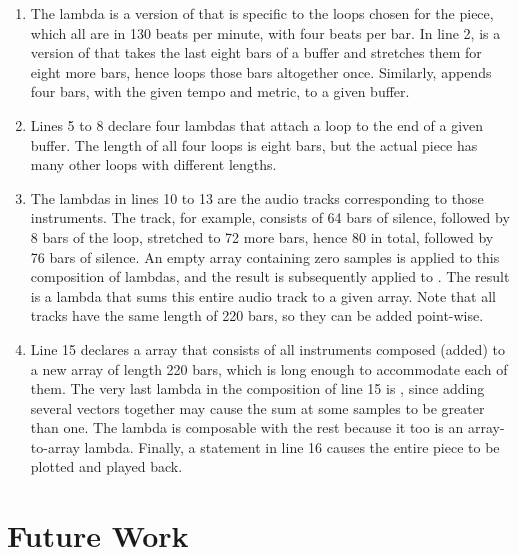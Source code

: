 \begin{enumerate}
	\item The  lambda is a version of  that is specific to the loops chosen for the piece, which all are in 130 beats per minute, with four beats per bar. In line 2,  is a version of  that takes the last eight bars of a buffer and stretches them for eight more bars, hence loops those bars altogether once. Similarly,  appends four bars, with the given tempo and metric, to a given buffer.
	\addtocounter{enumi}{3}
	\item Lines 5 to 8 declare four lambdas that attach a loop to the end of a given buffer. The length of all four loops is eight bars, but the actual piece has many other loops with different lengths.
	\addtocounter{enumi}{4}
	\item The lambdas in lines 10 to 13 are the audio tracks corresponding to those instruments. The  track, for example, consists of 64 bars of silence, followed by 8 bars of the  loop, stretched to 72 more bars, hence 80 in total, followed by 76 bars of silence. An empty array containing zero samples is applied to this composition of lambdas, and the result is subsequently applied to . The result is a lambda that sums this entire audio track to a given array. Note that all tracks have the same length of 220 bars, so they can be added point-wise.
	\addtocounter{enumi}{4}
	\item Line 15 declares a  array that consists of all instruments composed (added) to a new array of length 220 bars, which is long enough to accommodate each of them. The very last lambda in the composition of line 15 is , since adding several vectors together may cause the sum at some samples to be greater than one. The  lambda is composable with the rest because it too is an array-to-array lambda. Finally, a  statement in line 16 causes the entire piece to be plotted and played back.
\end{enumerate}

\section{Future Work}

